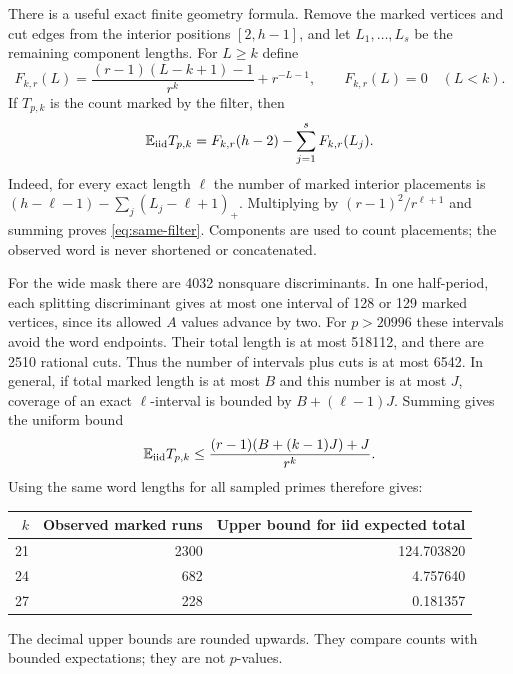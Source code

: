 \documentclass[11pt]{article}
\theoremstyle{definition}\newtheorem{definition}[theorem]{Definition}
\newcommand{\EE}{\mathbb E}
\begin{document}
There is a useful exact finite geometry formula.
Remove the marked vertices and cut edges from
the interior positions $[2,h-1]$, and let
$L_1,\ldots,L_s$ be the remaining component lengths.
For $L\ge k$ define
\[
 F_{k,r}(L)=
 \frac{(r-1)(L-k+1)-1}{r^k}+r^{-L-1},
 \qquad F_{k,r}(L)=0\quad(L<k).
\]
If $T_{p,k}$ is the count marked by the filter,
then
\begin{equation}\label{eq:same-filter}
 \EE_{\rm iid}T_{p,k}
 =F_{k,r}(h-2)-\sum_{j=1}^sF_{k,r}(L_j).
\end{equation}
Indeed, for every exact length $\ell$ the number
of marked interior placements is
$(h-\ell-1)-\sum_j(L_j-\ell+1)_+$.
Multiplying by $(r-1)^2/r^{\ell+1}$ and summing
proves \eqref{eq:same-filter}. Components are
used to count placements; the observed word is
never shortened or concatenated.

For the wide mask there are 4032 nonsquare
discriminants. In one half-period, each
splitting discriminant gives at most one
interval of 128 or 129 marked vertices,
since its allowed $A$ values advance by two.
For $p>20996$ these intervals avoid the
word endpoints. Their total length is at
most 518112, and there are 2510 rational
cuts. Thus the number of intervals plus
cuts is at most 6542. In general, if total
marked length is at most $B$ and this
number is at most $J$, coverage of an
exact $\ell$-interval is bounded by
$B+(\ell-1)J$. Summing gives the uniform
bound
\[
 \EE_{\rm iid}T_{p,k}\le
 \frac{(r-1)(B+(k-1)J)+J}{r^k}.
\]
Using the same word lengths for all sampled
primes therefore gives:
\begin{center}
\begin{tabular}{r rr}
\toprule
$k$&Observed marked runs&Upper bound for iid expected total\\
\midrule
21&2300&124.703820\\
24&682&4.757640\\
27&228&0.181357\\
\bottomrule
\end{tabular}
\end{center}
The decimal upper bounds are rounded upwards.
They compare counts with bounded expectations;
they are not $p$-values.
\end{document}

